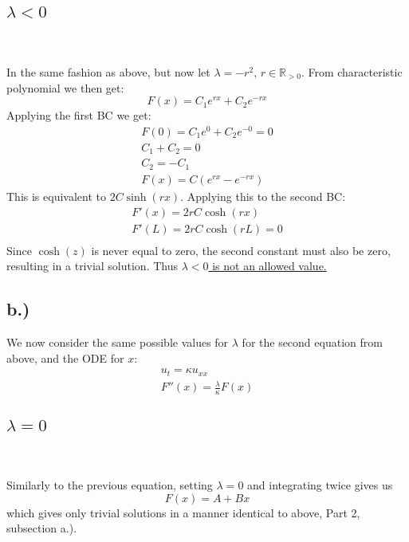 \documentclass{article}
\begin{document}
\subsection*{\underline{$\lambda < 0$}}~\\
\\
In the same fashion as above, but now let $\lambda = -r^2$, $r \in \mathbb{R}_{>0}$. From characteristic polynomial we then get:
\begin{equation}
F(x) = C_1e^{rx} + C_2e^{-rx}
\end{equation}
Applying the first BC we get:
\begin{equation}
\begin{aligned}
F(0) = C_1e^{0} + C_2e^{-0} = 0\\
C_1 + C_2 = 0\\
C_2 = - C_1\\
F(x) = C(e^{rx} - e^{-rx})
\end{aligned}
\end{equation}
This is equivalent to $2C\sinh(rx)$. Applying this to the second BC:
\begin{equation}
\begin{aligned}
F'(x) = 2rC\cosh(rx)\\
F'(L) = 2rC\cosh(rL) = 0\\
\end{aligned}
\end{equation}
Since $\cosh(z)$ is never equal to zero, the second constant must also be zero, resulting in a trivial solution. Thus \underline{$\lambda < 0$ is not an allowed value.}
\subsection*{b.)}
We now consider the same possible values for $\lambda$ for the second equation from above, and the ODE for $x$:
\begin{equation}
\begin{aligned}
u_t = \kappa u_{xx}\\
F''(x) = \frac{\lambda}{\kappa} F(x)
\end{aligned}
\end{equation}
\subsection*{\underline{$\lambda = 0$}}~\\
\\
Similarly to the previous equation, setting $\lambda = 0$ and integrating twice gives us
\begin{equation}
F(x) = A + Bx
\end{equation}
which gives only trivial solutions in a manner identical to above, Part 2, subsection a.).
\end{document}
